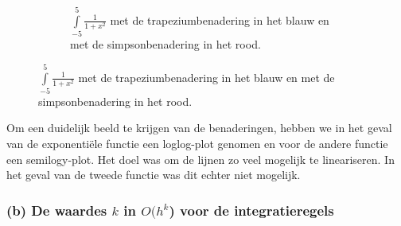 \documentclass[11pt,a4paper]{article}
\begin{document}
\begin{figure}[H]
\begin{subfigure}{0.5\textwidth}
	\caption*{$\int\limits_{-5}^5\frac{1}{1+x^2}$ met de trapeziumbenadering in het blauw en met de simpsonbenadering in het rood.}
	\end{subfigure}

\end{figure}

Om een duidelijk beeld te krijgen van de benaderingen, hebben we in het geval van de exponenti\"ele functie een loglog-plot genomen en voor de andere functie een semilogy-plot. Het doel was om de lijnen zo veel mogelijk te lineariseren. In het geval van de tweede functie was dit echter niet mogelijk.

\subsubsection*{(b) De waardes $k$ in $O(h^k$) voor de integratieregels}
\end{document}
